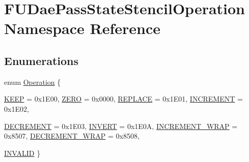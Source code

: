 \hypertarget{namespaceFUDaePassStateStencilOperation}{
\section{FUDaePassStateStencilOperation Namespace Reference}
\label{namespaceFUDaePassStateStencilOperation}
}
\subsection*{Enumerations}
\begin{DoxyCompactItemize}
\item 
enum \hyperlink{namespaceFUDaePassStateStencilOperation_a8024554a396a96ced879eae8c80b9ea7}{Operation} \{ \par
\hyperlink{namespaceFUDaePassStateStencilOperation_a8024554a396a96ced879eae8c80b9ea7a7e2166261985b13734744ac4211f6c7e}{KEEP} =  0x1E00, 
\hyperlink{namespaceFUDaePassStateStencilOperation_a8024554a396a96ced879eae8c80b9ea7a6c8609b7d92a2ab9e19629a56a4eb4e1}{ZERO} =  0x0000, 
\hyperlink{namespaceFUDaePassStateStencilOperation_a8024554a396a96ced879eae8c80b9ea7a150248d4032f56d2197d71237b1b6fec}{REPLACE} =  0x1E01, 
\hyperlink{namespaceFUDaePassStateStencilOperation_a8024554a396a96ced879eae8c80b9ea7a430432966a861290884717482f1b5ecb}{INCREMENT} =  0x1E02, 
\par
\hyperlink{namespaceFUDaePassStateStencilOperation_a8024554a396a96ced879eae8c80b9ea7a3eebad146cb6bd9907c63e1715aad02e}{DECREMENT} =  0x1E03, 
\hyperlink{namespaceFUDaePassStateStencilOperation_a8024554a396a96ced879eae8c80b9ea7a6157d9c15dc59666780234222499d735}{INVERT} =  0x1E0A, 
\hyperlink{namespaceFUDaePassStateStencilOperation_a8024554a396a96ced879eae8c80b9ea7a8de6b37723421988712c9d94aef2b38c}{INCREMENT\_\-WRAP} =  0x8507, 
\hyperlink{namespaceFUDaePassStateStencilOperation_a8024554a396a96ced879eae8c80b9ea7af151081f39eecfe11b9706c0b1bfd14e}{DECREMENT\_\-WRAP} =  0x8508, 
\par
\hyperlink{namespaceFUDaePassStateStencilOperation_a8024554a396a96ced879eae8c80b9ea7aca19f757adeb31e08def03d0ce264a69}{INVALID}
 \}
\end{DoxyCompactItemize}

